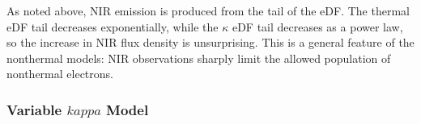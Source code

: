 As noted above, NIR emission is produced from the tail of the eDF.  The thermal eDF tail decreases exponentially, while the $\kappa$ eDF tail decreases as a power law, so the increase in NIR flux density is unsurprising.  This is a general feature of the nonthermal models: NIR observations sharply limit the allowed population of nonthermal electrons.







\subsubsection{Variable \texorpdfstring{$kappa$}{kappa} Model}

